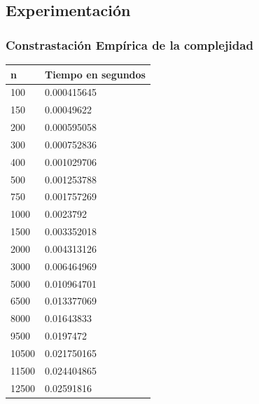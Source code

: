 	
\newpage
\subsection{Experimentaci\'on}

\subsubsection{Constrastaci\'on Emp\'irica de la complejidad}



\begin{table}[htb]
\centering
\begin{tabular}[c]{|l|l|}

		\hline
n & Tiempo en segundos\\
		\hline
100	&	0.000415645\\
		\hline
150	&	0.00049622\\
		\hline
200	&	0.000595058\\
		\hline
300	&	0.000752836\\
		\hline
400	&	0.001029706\\
		\hline
500	&	0.001253788\\
		\hline
750	&	0.001757269\\
		\hline
1000	&	0.0023792\\
		\hline
1500	&	0.003352018\\
		\hline
2000	&	0.004313126\\
		\hline
3000	&	0.006464969\\
		\hline
5000	&	0.010964701\\
		\hline
6500	&	0.013377069\\
		\hline
8000	&	0.01643833\\
		\hline
9500	&	0.0197472\\
		\hline
10500	&	0.021750165\\
		\hline
11500	&	0.024404865\\
		\hline
12500	&	0.02591816\\
		\hline
		
		
		
	\end{tabular}
\end{table}


